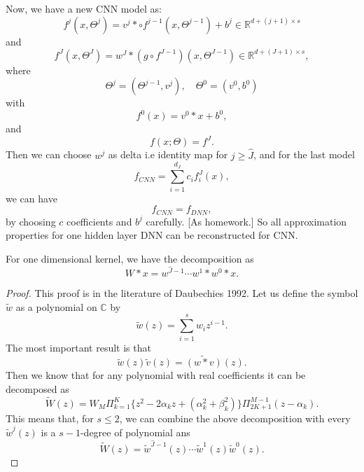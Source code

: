Now, we have a new CNN model as:
\begin{equation}\label{CNN_iteration_vector}
f^j(x,\Theta^j) = v^j \ast \circ f^{j-1}(x,\Theta^{j-1}) + b^j \in \mathbb{R}^{d + (j+1) \times s }
\end{equation}
and 
$$
f^J(x,\Theta^J) = w^J \ast ( g\circ f^{J-1})(x,\Theta^{J-1}) \in \mathbb{R}^{d + (J+1) \times s },
$$
where
\begin{equation}
\Theta^j=(\Theta^{j-1},v^j), \quad \Theta^0=(v^0, b^0) 
\end{equation}
with 
\begin{equation}
f^0(x)=v^0 \ast x + b^0,
\end{equation}
and 
\begin{equation}\label{CNN_finallayer}
f(x; \Theta) = f^J.
\end{equation}
Then we can choose $w^j$ as delta i.e identity map for $j \ge \hat J$, and for the last model
$$
f_{CNN} = \sum_{i= 1}^{d_J} c_i f^J_i(x),
$$
we can have
$$
f_{CNN} = f_{DNN},
$$
by choosing $c$ coefficients and $b^j$ carefully. [As homework.]
So all approximation properties for one hidden layer DNN can be reconstructed for CNN.

\begin{theorem}
	For one dimensional kernel, we have the decomposition as
	$$
	W\ast x = w^{\hat J-1} \cdots w^1\ast w^0 \ast x.
	$$
\end{theorem}
\begin{proof}
	This proof is in the literature of Daubechies 1992.  Let us define the symbol $\tilde w$ as a polynomial on $\mathbb{C}$ by 
	$$
	\tilde w (z) = \sum_{i=1}^s w_{i}z^{i-1}.
	$$
	The most important result is that
	$$
	\tilde w(z) \tilde v(z) = \widetilde{(w\ast v)}(z).
	$$
	Then we know that for any polynomial with real coefficients it can be decomposed as 
	$$
	\tilde W(z) = W_M \Pi_{k=1}^K\{z^2 - 2\alpha_kz + (\alpha_k^2 + \beta_k^2)\} \Pi_{2K+1}^{M-1}(z - \alpha_k).
	$$
	This means that, for $s \le 2$, we can combine the above decomposition with every $\tilde w^j(z)$ is a $s-1$-degree of polynomial ans
	$$
	\tilde W(z) = \tilde w^{\hat J-1}(z)\cdots \tilde w^{1}(z)\tilde w^{0}(z).
	$$
\end{proof}